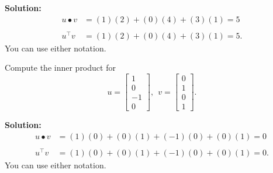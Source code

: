 \textbf{Solution:} \begin{align*}
u \bullet v &= (1)(2) + (0)(4) + (3)(1) = 5 \\
\\
u^\top v &= (1)(2) + (0)(4) + (3)(1) = 5.
\end{align*}
You can use either notation.\Qed \\


\begin{example}
\label{ex:InnerProduct02} Compute the inner product for $$u = \left[\begin{array}{r}  1 \\ 0 \\-1 \\0 \end{array} \right] ,~~ v= \left[\begin{array}{c}  0 \\ 1 \\0 \\1 \end{array} \right] .$$
\end{example}


\textbf{Solution:} 
\begin{align*}
u \bullet v &= (1)(0) + (0)(1) + (-1)(0) + (0)(1) = 0 \\
\\
u^\top v &= (1)(0) + (0)(1) + (-1)(0) + (0)(1) = 0.
\end{align*}
You can use either notation.\Qed \\


